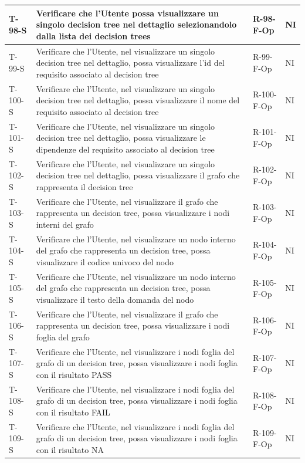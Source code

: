 \documentclass[a4paper,12pt]{article}
\begin{document}
{{\begin{longtable}{|p{}|p{}|p{}|p{}|}
                T-98-S & Verificare che l'Utente possa visualizzare un singolo decision tree nel dettaglio selezionandolo dalla lista dei decision trees & R-98-F-Op & NI \\ \hline
                T-99-S & Verificare che l'Utente, nel visualizzare un singolo decision tree nel dettaglio, possa visualizzare l'id del requisito associato al decision tree & R-99-F-Op & NI \\ \hline
                T-100-S & Verificare che l'Utente, nel visualizzare un singolo decision tree nel dettaglio, possa visualizzare il nome del requisito associato al decision tree & R-100-F-Op & NI \\ \hline
                T-101-S & Verificare che l'Utente, nel visualizzare un singolo decision tree nel dettaglio, possa visualizzare le dipendenze del requisito associato al decision tree & R-101-F-Op & NI \\ \hline
                T-102-S & Verificare che l'Utente, nel visualizzare un singolo decision tree nel dettaglio, possa visualizzare il grafo che rappresenta il decision tree & R-102-F-Op & NI \\ \hline
                T-103-S & Verificare che l'Utente, nel visualizzare il grafo che rappresenta un decision tree, possa visualizzare i nodi interni del grafo & R-103-F-Op & NI \\ \hline
                T-104-S & Verificare che l'Utente, nel visualizzare un nodo interno del grafo che rappresenta un decision tree, possa visualizzare il codice univoco del nodo & R-104-F-Op & NI \\ \hline
                T-105-S & Verificare che l'Utente, nel visualizzare un nodo interno del grafo che rappresenta un decision tree, possa visualizzare il testo della domanda del nodo & R-105-F-Op & NI \\ \hline
                T-106-S & Verificare che l'Utente, nel visualizzare il grafo che rappresenta un decision tree, possa visualizzare i nodi foglia del grafo & R-106-F-Op & NI \\ \hline
                T-107-S & Verificare che l'Utente, nel visualizzare i nodi foglia del grafo di un decision tree, possa visualizzare i nodi foglia con il risultato PASS & R-107-F-Op & NI \\ \hline
                T-108-S & Verificare che l'Utente, nel visualizzare i nodi foglia del grafo di un decision tree, possa visualizzare i nodi foglia con il risultato FAIL & R-108-F-Op & NI \\ \hline
                T-109-S & Verificare che l'Utente, nel visualizzare i nodi foglia del grafo di un decision tree, possa visualizzare i nodi foglia con il risultato NA & R-109-F-Op & NI \\ \hline

\end{longtable}}}
\end{document}
